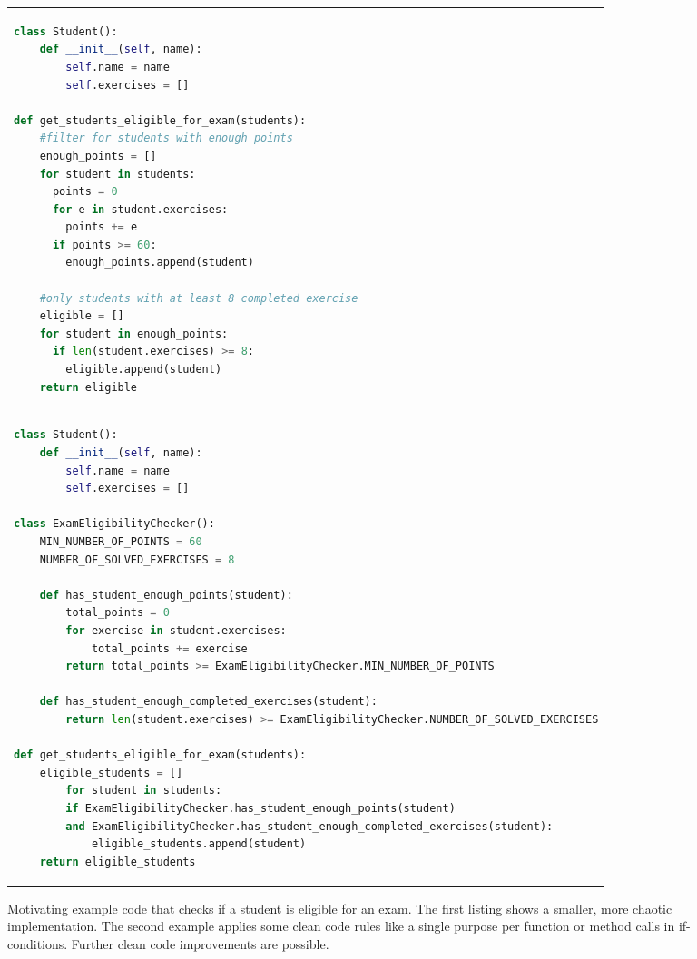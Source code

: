 \begin{figure}[h]
\begin{tabular}{p{\textwidth}}
\begin{minipage}{1\textwidth}
\centering
\begin{lstlisting}[basicstyle=\tiny, language=Python, label=lst:tokens_1, caption={}]
class Student():
    def __init__(self, name):
        self.name = name
        self.exercises = []

def get_students_eligible_for_exam(students):
    #filter for students with enough points
    enough_points = []
    for student in students:
      points = 0
      for e in student.exercises:
        points += e
      if points >= 60:
        enough_points.append(student)
    
    #only students with at least 8 completed exercise
    eligible = []
    for student in enough_points:
      if len(student.exercises) >= 8:
        eligible.append(student)
    return eligible
\end{lstlisting}
\end{minipage}
\\
\begin{minipage}[c]{1\textwidth}
\centering
\begin{lstlisting}[basicstyle=\tiny, language=Python, label=lst:tokens_2, caption={}]
class Student():
    def __init__(self, name):
        self.name = name
        self.exercises = []
    
class ExamEligibilityChecker():
    MIN_NUMBER_OF_POINTS = 60
    NUMBER_OF_SOLVED_EXERCISES = 8
    
    def has_student_enough_points(student):
        total_points = 0
        for exercise in student.exercises:
            total_points += exercise
        return total_points >= ExamEligibilityChecker.MIN_NUMBER_OF_POINTS
    
    def has_student_enough_completed_exercises(student):
        return len(student.exercises) >= ExamEligibilityChecker.NUMBER_OF_SOLVED_EXERCISES

def get_students_eligible_for_exam(students):
    eligible_students = []
        for student in students:
        if ExamEligibilityChecker.has_student_enough_points(student) 
        and ExamEligibilityChecker.has_student_enough_completed_exercises(student):
            eligible_students.append(student)
    return eligible_students    
\end{lstlisting}
\end{minipage}
\end{tabular}
\caption{Motivating example code that checks if a student is eligible for an exam. The first listing shows a smaller, more chaotic implementation. The second example applies some clean code rules like a single purpose per function or method calls in if-conditions. Further clean code improvements are possible.}
\label{list:motivating_example}
\end{figure}


